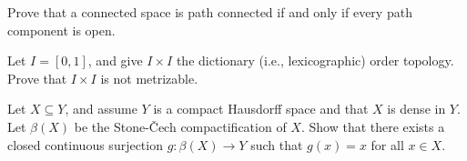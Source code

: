 \documentclass[bbb]{report}
\begin{document}
\begin{large}
\begin{description}
{\vspace{.5in}

\item[12.] Prove that a connected space is path connected if and
only if every path component is open.

\vspace{.5in}

\item[13.] Let $I=[0,1]$, and give $I\times I$ the dictionary 
(i.e., lexicographic) order topology. Prove that $I\times I$ is
not metrizable.

\vspace{.5in}

\item[14.] Let $X\subseteq Y$, and assume $Y$ is a compact
Hausdorff space and that $X$ is dense in $Y$. Let $\beta(X)$ be
the Stone-\v Cech compactification of $X$. Show that there exists
a closed continuous surjection $g:\beta(X)\to Y$ such that
$g(x)=x$ for all $x\in X$. 

}


\end{description}

\end{large}
\end{document}
